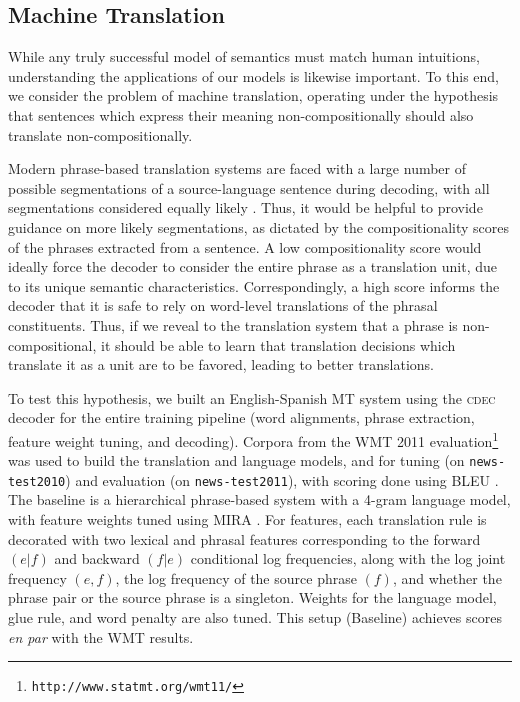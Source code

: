 \documentclass[11pt,letterpaper]{article}
\begin{document}
\subsection{Machine Translation}
\label{sec:mt-eval}

While any truly successful model of semantics must match human intuitions, understanding the applications of our models is likewise important. 
To this end, we consider the problem of machine translation, operating under the hypothesis that sentences which express their meaning non-compositionally should also translate non-compositionally. 

Modern phrase-based translation systems are faced with a large number of possible segmentations of a source-language sentence during decoding, with all segmentations considered equally likely \cite{Koehn2003}.  
Thus, it would be helpful to provide guidance on more likely segmentations, as dictated by the compositionality scores of the phrases extracted from a sentence. 
A low compositionality score would ideally force the decoder to consider the entire phrase as a translation unit, due to its unique semantic characteristics.
Correspondingly, a high score informs the decoder that it is safe to rely on word-level translations of the phrasal constituents. 
Thus, if we reveal to the translation system that a phrase is non-compositional, it should be able to learn that translation decisions which translate it as a unit are to be favored, leading to better translations.


To test this hypothesis, we built an English-Spanish MT system using the \textsc{cdec} decoder \cite{Dyer2010} for the entire training pipeline (word alignments, phrase extraction, feature weight tuning, and decoding).
Corpora from the WMT 2011 evaluation\footnote{\texttt{http://www.statmt.org/wmt11/}} was used to build the translation and language models, and for tuning (on \texttt{news-test2010}) and evaluation (on \texttt{news-test2011}), with scoring done using BLEU \cite{Papineni2002}. 
The baseline is a hierarchical phrase-based system \cite{Chiang2007} with a 4-gram language model, with feature weights tuned using MIRA \cite{Chiang2012}. 
For features, each translation rule is decorated with two lexical and phrasal features corresponding to the forward $(e|f)$ and backward $(f|e)$ conditional log frequencies, along with the log joint frequency $(e,f)$, the log frequency of the source phrase $(f)$, and whether the phrase pair or the source phrase is a singleton. 
Weights for the language model, glue rule, and word penalty are also tuned. 
This setup (Baseline) achieves scores \emph{en par} with the WMT results. 
\end{document}
